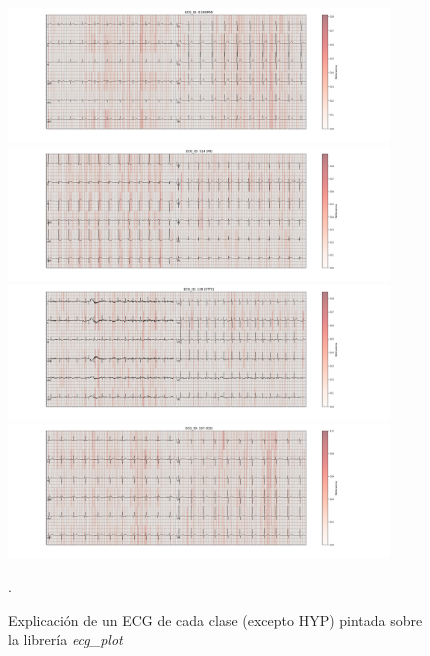 \begin{figure}
	\centering
	\includegraphics[width=0.9\textwidth]{Imagenes/Vectorial/better_explanations/NORM.png}
	\includegraphics[width=0.9\textwidth]{Imagenes/Vectorial/better_explanations/MI.png}
	\includegraphics[width=0.9\textwidth]{Imagenes/Vectorial/better_explanations/STTC.png}
	\includegraphics[width=0.9\textwidth]{Imagenes/Vectorial/better_explanations/CD.png}
	\caption{Explicación de un ECG de cada clase (excepto HYP) pintada sobre la librería \emph{ecg\_plot}}.
	\label{fig:explicacion_modificada}
\end{figure}